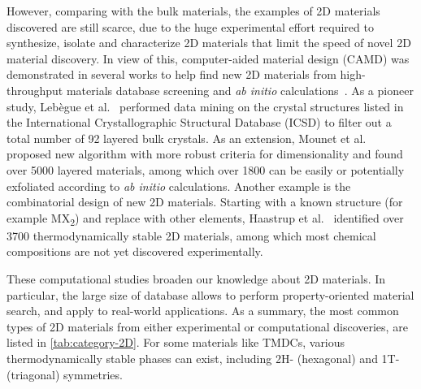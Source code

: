 %
However, comparing with the bulk materials, the examples of 2D
materials discovered are still scarce, due to the huge experimental
effort required to synthesize, isolate and characterize 2D materials
that limit the speed of novel 2D material discovery.
% 
In view of this, computer-aided material design (CAMD) was
demonstrated in several works to help find new 2D materials from
high-throughput materials database screening and \textit{ab initio}
calculations~\autocite{Lebegue_2013_prx,Zhuang_2013_database,Haastrup_2018_database,Mounet_2018_database,Zhou_2019_database}.
%
As a pioneer study, Lebègue et al.~\autocite{Lebegue_2013_prx} performed
data mining on the crystal structures listed in the International
Crystallographic Structural Database (ICSD) to filter out a total
number of 92 layered bulk crystals. As an extension, Mounet et al.~\autocite{Mounet_2018_database}
proposed new algorithm with more robust criteria for dimensionality
and found over 5000 layered materials, among which over 1800 can be
easily or potentially exfoliated according to \textit{ab initio}
calculations.
%
Another example is the combinatorial design of new 2D materials.
Starting with a known structure (for example MX\textsubscript{2}) and
replace with other elements, Haastrup et
al.~\autocite{Haastrup_2018_database} identified over 3700
thermo\-dynamically stable 2D materials, among which most chemical
compositions are not yet discovered experimentally.

These computational studies broaden our knowledge about 2D
materials. In particular, the large size of database allows
to perform property-oriented material search, and apply to real-world
applications. As a summary, the most common types of 2D materials from
either experimental or computational discoveries, are listed in
\autoref{tab:category-2D}. For some materials like TMDCs, various
thermo\-dynamically stable phases can exist, including 2H- (hexagonal)
and 1T- (triagonal) symmetries.

